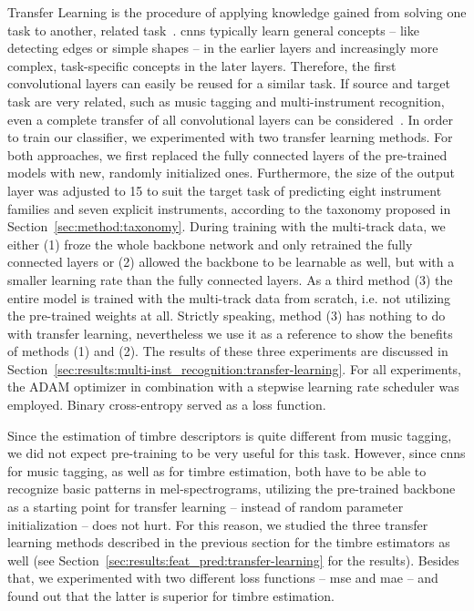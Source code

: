 Transfer Learning is the procedure of applying knowledge gained from solving one task to another, related task~\cite{tan2018survey}. \Glspl{cnn} typically learn general concepts -- like detecting edges or simple shapes -- in the earlier layers and increasingly more complex, task-specific concepts in the later layers. Therefore, the first convolutional layers can easily be reused for a similar task. If source and target task are very related, such as music tagging and multi-instrument recognition, even a complete transfer of all convolutional layers can be considered~\cite{ribani2019survey}. In order to train our classifier, we experimented with two transfer learning methods. For both approaches, we first replaced the fully connected layers of the pre-trained models with new, randomly initialized ones. Furthermore, the size of the output layer was adjusted to 15 to suit the target task of predicting eight instrument families and seven explicit instruments, according to the taxonomy proposed in Section~\ref{sec:method:taxonomy}. During training with the multi-track data, we either (1) froze the whole backbone network and only retrained the fully connected layers or (2) allowed the backbone to be learnable as well, but with a smaller learning rate than the fully connected layers. As a third method (3) the entire model is trained with the multi-track data from scratch, i.e. not utilizing the pre-trained weights at all. Strictly speaking, method (3) has nothing to do with transfer learning, nevertheless we use it as a reference to show the benefits of methods (1) and (2). The results of these three experiments are discussed in Section~\ref{sec:results:multi-inst_recognition:transfer-learning}. For all experiments, the ADAM optimizer in combination with a stepwise learning rate scheduler was employed. Binary cross-entropy served as a loss function.

Since the estimation of timbre descriptors is quite different from music tagging, we did not expect pre-training to be very useful for this task. However, since \glspl{cnn} for music tagging, as well as for timbre estimation, both have to be able to recognize basic patterns in mel-spectrograms, utilizing the pre-trained backbone as a starting point for transfer learning -- instead of random parameter initialization -- does not hurt. For this reason, we studied the three transfer learning methods described in the previous section for the timbre estimators as well (see Section~\ref{sec:results:feat_pred:transfer-learning} for the results). Besides that, we experimented with two different loss functions -- \gls{mse} and \gls{mae} -- and found out that the latter is superior for timbre estimation.\\ 

